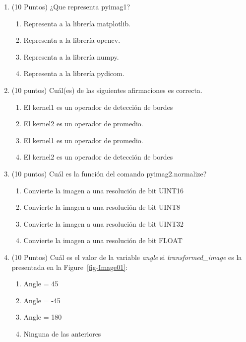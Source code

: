 \documentclass[12pt,a4paper]{article}
\providecommand{\tightlist}{%
  \setlength{\itemsep}{0pt}\setlength{\parskip}{0pt}}\usepackage{longtable,booktabs,array}
\providecommand{\tightlist}{%
  \setlength{\itemsep}{0pt}\setlength{\parskip}{2pt}}
\begin{document}
\begin{enumerate}
\tightlist
\item
  (10 Puntos) ¿Que representa pyimag1?

  \begin{enumerate}
  \tightlist
  \item
    Representa a la librería matplotlib.
  \item
    Representa a la librería opencv.
  \item
    Representa a la librería numpy.
  \item
    Representa a la librería pydicom.
  \end{enumerate}
\item
  (10 puntos) Cuál(es) de las siguientes afirmaciones es correcta.

  \begin{enumerate}
  \tightlist
  \item
    El kernel1 es un operador de detección de bordes\\
  \item
    El kernel2 es un operador de promedio.
  \item
    El kernel1 es un operador de promedio.
  \item
    El kernel2 es un operador de detección de bordes
  \end{enumerate}
\item
  (10 puntos) Cuál es la función del comando pyimag2.normalize?

  \begin{enumerate}
  \tightlist
  \item
    Convierte la imagen a una resolución de bit UINT16
  \item
    Convierte la imagen a una resolución de bit UINT8
  \item
    Convierte la imagen a una resolución de bit UINT32
  \item
    Convierte la imagen a una resolución de bit FLOAT
  \end{enumerate}
\item
  (10 Puntos) Cuál es el valor de la variable \emph{angle} si
  \emph{transformed\_image} es la presentada en la
  Figure~\ref{fig-Image01}:

  \begin{enumerate}
  \tightlist
  \item
    Angle = 45
  \item
    Angle = -45
  \item
    Angle = 180
  \item
    Ninguna de las anteriores
  \end{enumerate}
\end{enumerate}
\end{document}
